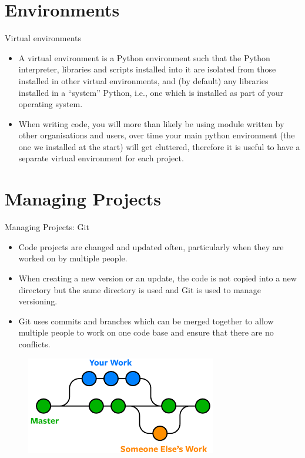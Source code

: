 \documentclass[aspectratio=169]{beamer}
\begin{document}
\section{Environments}


\begin{frame}{Virtual environments}

\begin{itemize}
	\item A virtual environment is a Python environment such that the Python interpreter, libraries and scripts installed into it are isolated from those installed in other virtual environments, and (by default) any libraries installed in a “system” Python, i.e., one which is installed as part of your operating system.
	\item When writing code, you will more than likely be using module written by other organisations and users, over time your main python environment (the one we installed at the start) will get cluttered, therefore it is useful to have a separate virtual environment for each project. 
\end{itemize}
 	
\end{frame}

\section{Managing Projects}

\begin{frame}{Managing Projects: Git}


	\begin{itemize}
		\item Code projects are changed and updated often, particularly when they are worked on by multiple people. 
		\item When creating a new version or an update, the code is not copied into a new directory but the same directory is used and Git is used to manage versioning.
		\item Git uses commits and branches which can be merged together to allow multiple people to work on one code base and ensure that there are no conflicts. 
	\end{itemize}

\begin{figure}
\centering	
	\includegraphics[scale=0.5]{graphics/git.png}
\end{figure}

\end{frame}
\end{document}
